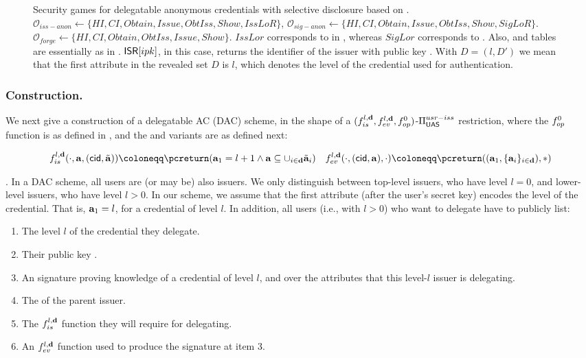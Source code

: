 \begin{figure}[ht!]
{  }
  \caption{Security games for delegatable anonymous credentials with selective
    disclosure based on \cite{fhs19}. $\mathcal{O}_{iss-anon} \gets \lbrace HI,
    CI,Obtain,Issue,ObtIss,Show,IssLoR\rbrace$, $\mathcal{O}_{sig-anon} \gets
    \lbrace HI,CI,Obtain,Issue,ObtIss,Show,SigLoR\rbrace$. $\mathcal{O}_{forge}
    \gets \lbrace HI,CI,Obtain,ObtIss,Issue,Show\rbrace$. $IssLor$ corresponds
    to \OBTCHALb in \UAS, whereas $SigLor$ corresponds to \CHALb. Also, \OWNR
    and \ATTR tables are essentially as in .
    $\mathsf{ISR}[ipk]$, in this case, returns the identifier of the issuer with public
    key \ipk. With $D = (l,D')$ we mean that the first attribute in the revealed
    set $D$ is $l$, which denotes the level of the credential used for
    authentication.}
  \label{fig:model-dac}  
\end{figure}

\subsubsection{\CUASDAC Construction.} %
We next give a construction of a delegatable AC (DAC) scheme, in the shape of
a $(f_{is}^{l,\mathbf{d}},f_{ev}^{l,\mathbf{d}},f_{op}^0)$-$\Pi_{\mathsf{UAS}}^{usr-iss}$
restriction, where the $f_{op}^0$ function is as defined in
, and the \fissue and \feval variants are as
defined next:

\begin{align}
  & \fissue^{l,\dattrs}(\cdot,\attrs,(\cid,\cattrs)) \coloneqq
    \pcreturn (\attrs_1 = l+1 \land \attrs \subseteq
    \cup_{i\in\dattrs} \cattrs_i) \nonumber
  & \feval^{l,\dattrs}(\cdot,(\cid,\attrs),\cdot) \coloneqq
    \pcreturn((\attrs_1,\lbrace\attrs_i\rbrace_{i\in\dattrs}),\ast)
    \label{eq:funcs-rac}
\end{align}

. In a DAC scheme, all users are (or may be) also issuers. We only
distinguish between top-level issuers, who have level $l=0$, and lower-level
issuers, who have level $l>0$. In our \CUASDAC scheme, we assume that the first
attribute (after the user's secret key) encodes the level of the credential.
That is, $\mathbf{a}_1=l$, for a credential of level $l$. In addition, all users
(i.e., with $l>0$) who want to delegate have to publicly list:

\begin{enumerate}
\item The level $l$ of the credential they delegate.
\item Their public key \ipk.
\item An \UAS signature proving knowledge of a credential of level $l$, and over
  the attributes that this level-$l$ issuer is delegating.
\item The \ipk of the parent issuer.
\item The $f_{is}^{l,\mathbf{d}}$ function they will require for delegating.
\item An $f_{ev}^{l,\mathbf{d}}$ function used to produce the signature at item 3.
\end{enumerate}

